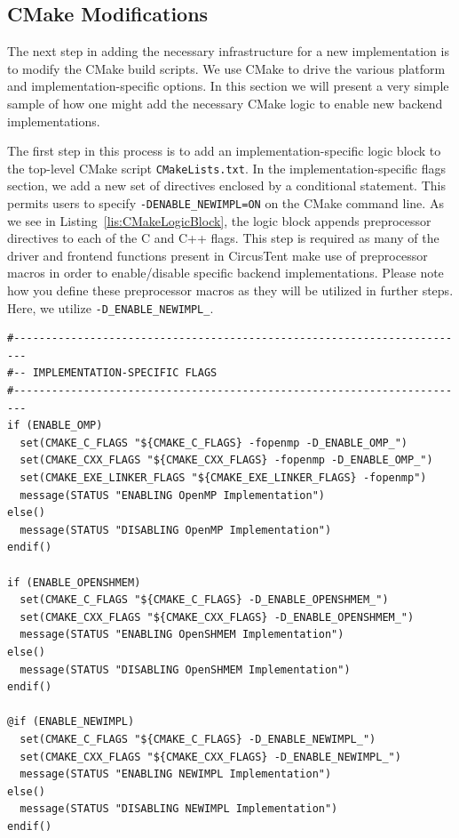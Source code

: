 \documentclass{article}
\begin{document}
\clearpage
\subsection{CMake Modifications}
\label{sec:CMakeMods}

The next step in adding the necessary infrastructure for a new implementation 
is to modify the CMake build scripts.  We use CMake to drive the various platform 
and implementation-specific options.  In this section we will present a very simple 
sample of how one might add the necessary CMake logic to enable new backend implementations.  

The first step in this process is to add an implementation-specific logic block to the 
top-level CMake script \texttt{CMakeLists.txt}.  In the implementation-specific flags section, 
we add a new set of directives enclosed by a conditional statement.  This permits users
to specify \texttt{-DENABLE\_NEWIMPL=ON} on the CMake command line.  As we see 
in Listing~\ref{lis:CMakeLogicBlock}, the logic block appends preprocessor directives 
to each of the C and C++ flags.  This step is required as many of the driver and frontend 
functions present in CircusTent make use of preprocessor macros in order to enable/disable 
specific backend implementations.  Please note how you define these preprocessor macros 
as they will be utilized in further steps.  Here, we utilize \texttt{-D\_ENABLE\_NEWIMPL\_}.  

\vspace{0.125in}
\begin{lstlisting}[frame=single,style=base,caption={CMake Logic Block},captionpos=b,label={lis:CMakeLogicBlock}]
#------------------------------------------------------------------------
#-- IMPLEMENTATION-SPECIFIC FLAGS
#------------------------------------------------------------------------
if (ENABLE_OMP)
  set(CMAKE_C_FLAGS "${CMAKE_C_FLAGS} -fopenmp -D_ENABLE_OMP_")
  set(CMAKE_CXX_FLAGS "${CMAKE_CXX_FLAGS} -fopenmp -D_ENABLE_OMP_")
  set(CMAKE_EXE_LINKER_FLAGS "${CMAKE_EXE_LINKER_FLAGS} -fopenmp")
  message(STATUS "ENABLING OpenMP Implementation")
else()
  message(STATUS "DISABLING OpenMP Implementation")
endif()

if (ENABLE_OPENSHMEM)
  set(CMAKE_C_FLAGS "${CMAKE_C_FLAGS} -D_ENABLE_OPENSHMEM_")
  set(CMAKE_CXX_FLAGS "${CMAKE_CXX_FLAGS} -D_ENABLE_OPENSHMEM_")
  message(STATUS "ENABLING OpenSHMEM Implementation")
else()
  message(STATUS "DISABLING OpenSHMEM Implementation")
endif()

@if (ENABLE_NEWIMPL)
  set(CMAKE_C_FLAGS "${CMAKE_C_FLAGS} -D_ENABLE_NEWIMPL_")
  set(CMAKE_CXX_FLAGS "${CMAKE_CXX_FLAGS} -D_ENABLE_NEWIMPL_")
  message(STATUS "ENABLING NEWIMPL Implementation")
else()
  message(STATUS "DISABLING NEWIMPL Implementation")
endif()
\end{lstlisting}
\end{document}
